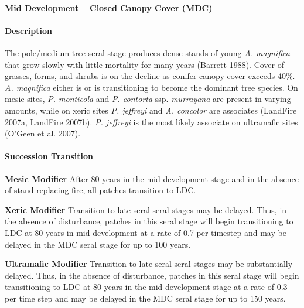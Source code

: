 \noindent\hrulefill

\paragraph{Mid Development – Closed Canopy Cover (MDC)}

\paragraph{Description} The pole/medium tree seral stage produces dense stands of young \emph{A. magnifica} that grow slowly with little mortality for many years (Barrett 1988). Cover of grasses, forms, and shrubs is on the decline as conifer canopy cover exceeds 40\%. \emph{A. magnifica} either is or is transitioning to become the dominant tree species. On mesic sites, \emph{P. monticola} and \emph{P. contorta} ssp. \emph{murrayana} are present in varying amounts, while on xeric sites \emph{P. jeffreyi} and \emph{A. concolor} are associates (LandFire 2007a, LandFire 2007b). \emph{P. jeffreyi} is the most likely associate on ultramafic sites (O'Geen et al. 2007).

\paragraph{Succession Transition}
\begin{adjustwidth}{2cm}{}
\noindent \textbf{Mesic Modifier } After 80 years in the mid development stage and in the absence of stand-replacing fire, all patches transition to LDC.

\medskip
\noindent \textbf{Xeric Modifier}  Transition to late seral seral stages may be delayed. Thus, in the absence of disturbance, patches in this seral stage will begin transitioning to LDC at 80 years in mid development at a rate of 0.7 per timestep and may be delayed in the MDC seral stage for up to 100 years.

\medskip
\noindent \textbf{Ultramafic Modifier} Transition to late seral seral stages may be substantially delayed. Thus, in the absence of disturbance, patches in this seral stage will begin transitioning to LDC at 80 years in the mid development stage at a rate of 0.3 per time step and may be delayed in the MDC seral stage for up to 150 years.

\end{adjustwidth}

